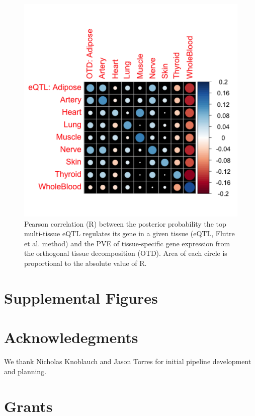 \documentclass[]{article}
\begin{document}
\begin{figure}[htbp]
\centering
\includegraphics{GenArch_manuscript_files/figure-latex/corrplot-1.pdf}
\caption{Pearson correlation (R) between the posterior probability the
top multi-tissue eQTL regulates its gene in a given tissue (eQTL, Flutre
et al. method) and the PVE of tissue-specific gene expression from the
orthogonal tissue decomposition (OTD). Area of each circle is
proportional to the absolute value of R.}
\end{figure}

\section{Supplemental Figures}\label{supplemental-figures}

\section{Acknowledegments}\label{acknowledegments}

We thank Nicholas Knoblauch and Jason Torres for initial pipeline
development and planning.

\section{Grants}\label{grants}
\end{document}
